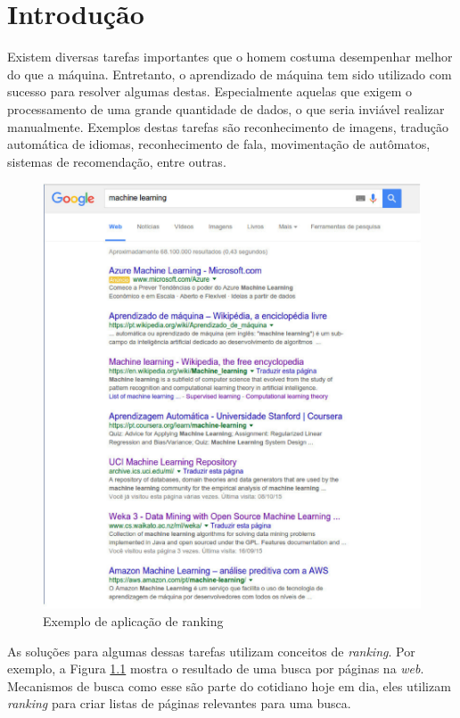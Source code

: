 \chapter{Introdução}

Existem diversas tarefas importantes que o homem costuma desempenhar melhor do que a máquina.
Entretanto, o aprendizado de máquina tem sido utilizado com sucesso para resolver algumas destas.
Especialmente aquelas que exigem o processamento de uma grande quantidade de dados, o que seria inviável realizar manualmente.
Exemplos destas tarefas são reconhecimento de imagens, tradução automática de idiomas, reconhecimento de fala, movimentação de autômatos, sistemas de recomendação, entre outras.

\begin{figure}[h!]
  \includegraphics[width=\linewidth]{images/intro01.eps}
  \caption{Exemplo de aplicação de ranking}
  \label{fig:introducao01}
\end{figure}

As soluções para algumas dessas tarefas utilizam conceitos de \textit{ranking}.
Por exemplo, a Figura \ref{fig:introducao01} mostra o resultado de uma busca por páginas na \textit{web}.
Mecanismos de busca como esse são parte do cotidiano hoje em dia, eles utilizam \textit{ranking} para criar listas de páginas relevantes para uma busca.

